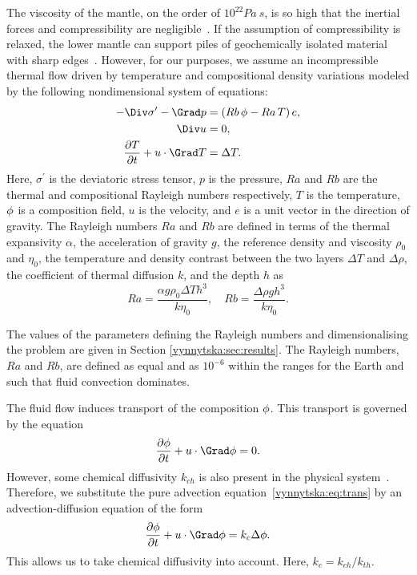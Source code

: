 The viscosity of the mantle, on the order of $10^{22}Pa~s$, is so high
that the inertial forces and compressibility are
negligible~\citep{Ricard2009}. If the assumption of compressibility is
relaxed, the lower mantle can support piles of geochemically isolated
material with sharp edges~\citep{TanGurnis2005}. However, for our
purposes, we assume an incompressible thermal flow driven by
temperature and compositional density variations modeled by the
following nondimensional system of equations:
\begin{align}
  \label{vynnytska:eq:momentum}
  - \Div \sigma^{\prime} - \Grad p
  &=  \left( Rb \, \composition - Ra \, T \right) e,\\
  \label{vynnytska:eq:incompress}
  \Div u & =  0,\\
  \label{vynnytska:eq:energy}
  \frac{\partial T}{\partial t} + u \cdot \Grad T & =  \Delta T.
\end{align}
Here, $\sigma^{\prime}$ is the deviatoric stress tensor, $p$ is the
pressure, $Ra$ and $Rb$ are the thermal and compositional Rayleigh
numbers respectively, $T$ is the temperature, $\phi$ is a
composition field, $u$ is the velocity, and $e$ is a unit vector in
the direction of gravity. The Rayleigh numbers
$Ra$ and $Rb$ are defined in terms of the thermal expansivity
$\alpha$, the acceleration of gravity $g$, the reference density and
viscosity $\rho_0$ and $\eta_0$, the temperature and density contrast
between the two layers $\Delta T$ and $\Delta \rho$, the coefficient
of thermal diffusion $k$, and the depth $h$ as
\begin{equation}
  Ra = \frac{\alpha g \rho_0 \Delta T h^3}{k \eta_0},  \quad
  Rb = \frac{\Delta \rho g h^3}{k \eta_0}.
\end{equation}

The values of the parameters defining the Rayleigh numbers and
dimensionalising the problem are given in
Section \ref{vynnytska:sec:results}. The Rayleigh numbers, $Ra$ and
$Rb$, are defined as equal and as $10^{-6}$ within the ranges for the
Earth \citep{MontagueKelloggManga1998} and such that fluid convection
dominates.

The fluid flow induces transport of the composition
$\phi$. This transport is governed by the equation
\begin{equation}
  \label{vynnytska:eq:trans}
  \frac{\partial \composition}{\partial t} +  u \cdot \Grad \composition = 0.
\end{equation}
However, some chemical diffusivity $k_{ch}$ is also present in the physical
system~\citep{KekenEtAl1997, HansenYuen1988}. Therefore, we substitute
the pure advection equation~\eqref{vynnytska:eq:trans} by an
advection-diffusion equation of the form
\begin{equation}
  \label{vynnytska:eq:transdif}
  \frac{\partial \composition}{\partial t}
  + u  \cdot \Grad \composition =  k_c \Delta \composition .
\end{equation}
This allows us to take chemical diffusivity into account. Here, $k_c =
k_{ch}/k_{th}$.

